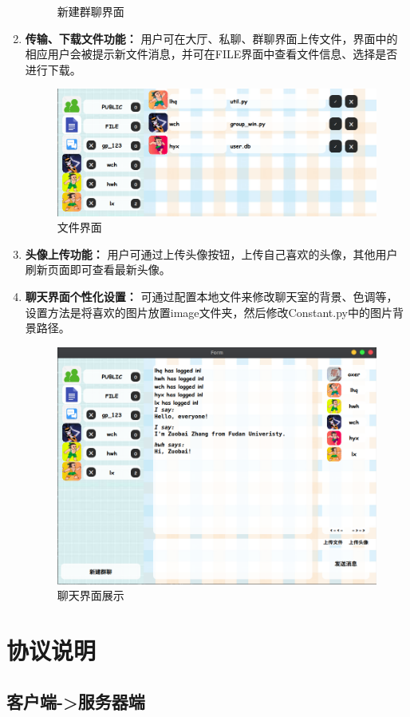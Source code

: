 \documentclass[12pt]{article} %
\begin{document}
\begin{sloppypar}
\begin{enumerate}
\begin{figure}[htbp]
		\caption{新建群聊界面}
	\end{figure}
	\item {\bf 传输、下载文件功能：} 用户可在大厅、私聊、群聊界面上传文件，界面中的相应用户会被提示新文件消息，并可在FILE界面中查看文件信息、选择是否进行下载。
	\begin{figure}[htbp]
		\centering
		\includegraphics[width=0.8\linewidth]{figure/file.png}
		\caption{文件界面}
	\end{figure}
	\item {\bf 头像上传功能：} 用户可通过上传头像按钮，上传自己喜欢的头像，其他用户刷新页面即可查看最新头像。
	\item {\bf 聊天界面个性化设置：} 可通过配置本地文件来修改聊天室的背景、色调等，设置方法是将喜欢的图片放置image文件夹，然后修改Constant.py中的图片背景路径。
	\begin{figure}[htbp]
		\centering
		\includegraphics[width=0.8\linewidth]{figure/demo.png}
		\caption{聊天界面展示}
	\end{figure}
\end{enumerate}



\section{协议说明}

\subsection{客户端->服务器端}


\end{sloppypar}
\end{document}

